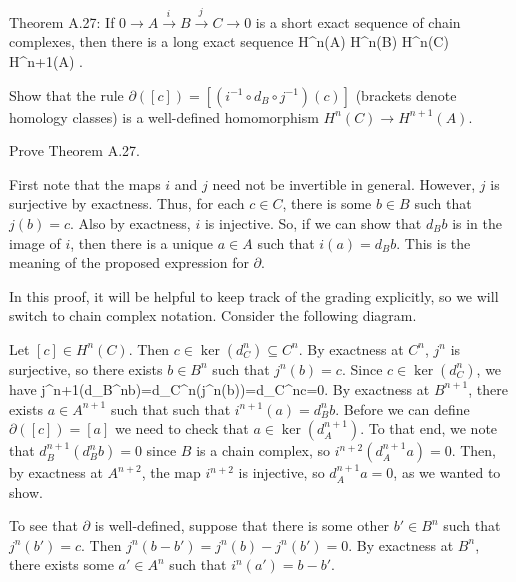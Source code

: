 \addtocounter{exercise}{1}

\bp
Theorem A.27: If $0 \to A \xrightarrow{ i\, }B\xrightarrow{ j\, } C \to 0$ is a short exact sequence of chain complexes, then there is a long exact sequence
\bse
\cdots \to H^n(A)  H^n(B)   H^n(C)  \xrightarrow{ \ \partial\ } H^{n+1}(A) \to \cdots .
\ese
\ben[label=(\alph*)]
\item Show that the rule $\partial([c]) = [(i^{-1}\circ d_B\circ j^{-1})(c)]$ (brackets denote homology classes) is a well-defined homomorphism $H^n(C) \to H^{n+1}(A)$.
\item Prove Theorem A.27.
\een
\ep

\bs
\ben[label=(\alph*)]
\item First note that the maps $i$ and $j$ need not be invertible in general. However, $j$ is surjective by exactness. Thus, for each $c\in C$, there is some $b\in B$ such that $j(b)=c$. Also by exactness, $i$ is injective. So, if we can show that $d_Bb$ is in the image of $i$, then there is a unique $a\in A$ such that $i(a)=d_Bb$. This is the meaning of the proposed expression for $\partial$. 

In this proof, it will be helpful to keep track of the grading explicitly, so we will switch to chain complex notation. Consider the following diagram.
\bse
{}
\ese
Let $[c]\in H^n(C)$. Then $c\in \ker(d_C^n)\subseteq C^n$. By exactness at $C^n$, $j^n$ is surjective, so there exists $b\in B^n$ such that $j^n(b)=c$. Since $c\in \ker(d_C^n)$, we have 
\bse
j^{n+1}(d_B^nb)=d_C^n(j^n(b))=d_C^nc=0.
\ese
By exactness at $B^{n+1}$, there exists $a\in A^{n+1}$ such that such that $i^{n+1}(a)=d_B^nb$. Before we can define $\partial([c])=[a]$ we need to check that $a\in \ker(d_A^{n+1})$. To that end, we note that $d_B^{n+1}(d_B^nb)=0$ since $B$ is a chain complex, so $i^{n+2}(d_A^{n+1}a)=0$. Then, by exactness at $A^{n+2}$, the map $i^{n+2}$ is injective, so $d_A^{n+1}a=0$, as we wanted to show.

To see that $\partial$ is well-defined, suppose that there is some other $b'\in B^n$ such that $j^n(b')=c$. Then $j^n(b-b')=j^n(b)-j^n(b')=0$. By exactness at $B^n$, there exists some $a'\in A^n$ such that $i^n(a')=b-b'$. 
\item 
\een
\es



















